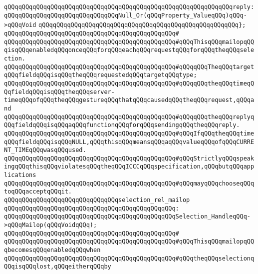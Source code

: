 \verb|qQQqqQQqqQQqqQQqqQQqqQQqqQQqqQQqqQQqqQQqqQQqqQQqqQQqqQQqqQQqqQQqreply:qQQqqQQqqQQqqQQqqQQqqQQqqQQqqQQqNull_Or(qQQqProperty_ValueqQQq)qQQq->qQQqVoid|\newline
\verb|qQQqqQQqqQQqqQQqqQQqqQQqqQQqqQQqqQQqqQQqqQQqqQQqqQQqqQQq};|\newline
\verb|qQQqqQQqqQQqqQQqqQQqqQQqqQQqqQQqqQQqqQQqqQQqqQQq#|\newline
\verb|qQQqqQQqqQQqqQQqqQQqqQQqqQQqqQQqqQQqqQQqqQQqqQQq#qQQqThisqQQqmailopqQQqisqQQqenabledqQQqonceqQQqforqQQqeachqQQqrequestqQQqforqQQqtheqQQqselection.|\newline
\verb|qQQqqQQqqQQqqQQqqQQqqQQqqQQqqQQqqQQqqQQqqQQqqQQq#qQQqqQQqTheqQQqtargetqQQqfieldqQQqisqQQqtheqQQqrequestedqQQqtargetqQQqtype;|\newline
\verb|qQQqqQQqqQQqqQQqqQQqqQQqqQQqqQQqqQQqqQQqqQQqqQQq#qQQqqQQqtheqQQqtimeqQQqfieldqQQqisqQQqtheqQQqserver-timeqQQqofqQQqtheqQQqgestureqQQqthatqQQqcausedqQQqtheqQQqrequest,qQQqand|\newline
\verb|qQQqqQQqqQQqqQQqqQQqqQQqqQQqqQQqqQQqqQQqqQQqqQQq#qQQqqQQqtheqQQqreplyqQQqfieldqQQqisqQQqaqQQqfunctionqQQqforqQQqsendingqQQqtheqQQqreply.|\newline
\verb|qQQqqQQqqQQqqQQqqQQqqQQqqQQqqQQqqQQqqQQqqQQqqQQq#qQQqIfqQQqtheqQQqtimeqQQqfieldqQQqisqQQqNULL,qQQqthisqQQqmeansqQQqaqQQqvalueqQQqofqQQqCURRENT_TIMEqQQqwasqQQqused.|\newline
\verb|qQQqqQQqqQQqqQQqqQQqqQQqqQQqqQQqqQQqqQQqqQQqqQQq#qQQqStrictlyqQQqspeakingqQQqthisqQQqviolatesqQQqtheqQQqICCCqQQqspecification,qQQqbutqQQqapplications|\newline
\verb|qQQqqQQqqQQqqQQqqQQqqQQqqQQqqQQqqQQqqQQqqQQqqQQq#qQQqmayqQQqchooseqQQqtoqQQqacceptqQQqit.|\newline
\newline
\newline
\verb|qQQqqQQqqQQqqQQqqQQqqQQqqQQqqQQqselection_rel_mailop|\newline
\verb|qQQqqQQqqQQqqQQqqQQqqQQqqQQqqQQqqQQqqQQqqQQqqQQq:|\newline
\verb|qQQqqQQqqQQqqQQqqQQqqQQqqQQqqQQqqQQqqQQqqQQqqQQqSelection_HandleqQQq->qQQqMailop(qQQqVoidqQQq);|\newline
\verb|qQQqqQQqqQQqqQQqqQQqqQQqqQQqqQQqqQQqqQQqqQQqqQQq#|\newline
\verb|qQQqqQQqqQQqqQQqqQQqqQQqqQQqqQQqqQQqqQQqqQQqqQQq#qQQqThisqQQqmailopqQQqbecomesqQQqenabledqQQqwhen|\newline
\verb|qQQqqQQqqQQqqQQqqQQqqQQqqQQqqQQqqQQqqQQqqQQqqQQq#qQQqtheqQQqselectionqQQqisqQQqlost,qQQqeitherqQQqby|\newline
